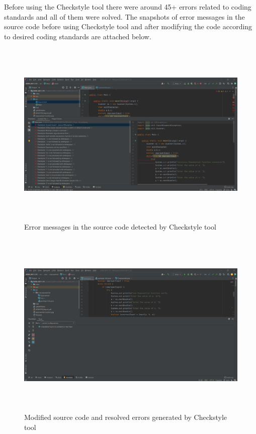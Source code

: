 \documentclass[12pt, a4paper]{article}
\begin{document}
\noindent
Before using the Checkstyle tool there were around 45+ errors related to coding standards  and all of them were solved. The snapshots of error messages in the source code before using Checkstyle tool and after modifying the code according to desired coding standards are attached below. 


\newpage

\begin{figure}[h]
  \includegraphics[width=15cm,height=9cm]{CheckStyle(Before).png}
  \caption{Error messages in the source code detected by Checkstyle tool}
  \label{fig:Debugging computation of exponential function}
\end{figure}


\begin{figure}[h!]
  \includegraphics[width=15cm,height=9cm]{CheckStyle(After).png}
  \caption{Modified source code and resolved errors generated by Checkstyle tool}
  \label{Debugging computation of fractional exponent value}
\end{figure}
\end{document}
